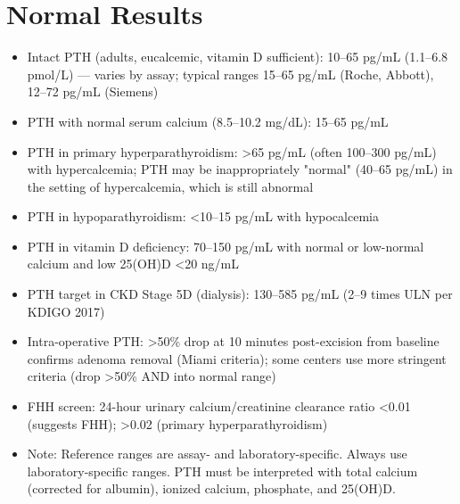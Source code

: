 \section*{Normal Results}
\begin{itemize}
  \item Intact PTH (adults, eucalcemic, vitamin D sufficient): 10--65 pg/mL (1.1--6.8 pmol/L) --- varies by assay; typical ranges 15--65 pg/mL (Roche, Abbott), 12--72 pg/mL (Siemens)
  \item PTH with normal serum calcium (8.5--10.2 mg/dL): 15--65 pg/mL
  \item PTH in primary hyperparathyroidism: >65 pg/mL (often 100--300 pg/mL) with hypercalcemia; PTH may be inappropriately "normal" (40--65 pg/mL) in the setting of hypercalcemia, which is still abnormal
  \item PTH in hypoparathyroidism: <10--15 pg/mL with hypocalcemia
  \item PTH in vitamin D deficiency: 70--150 pg/mL with normal or low-normal calcium and low 25(OH)D <20 ng/mL
  \item PTH target in CKD Stage 5D (dialysis): 130--585 pg/mL (2--9 times ULN per KDIGO 2017)
  \item Intra-operative PTH: >50\% drop at 10 minutes post-excision from baseline confirms adenoma removal (Miami criteria); some centers use more stringent criteria (drop >50\% AND into normal range)
  \item FHH screen: 24-hour urinary calcium/creatinine clearance ratio <0.01 (suggests FHH); >0.02 (primary hyperparathyroidism)
  \item Note: Reference ranges are assay- and laboratory-specific. Always use laboratory-specific ranges. PTH must be interpreted with total calcium (corrected for albumin), ionized calcium, phosphate, and 25(OH)D.
\end{itemize}

